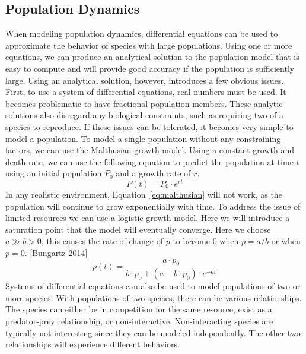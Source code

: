 \subsection{Population Dynamics}\label{subsec:population-dynamics}
    When modeling population dynamics, differential equations can be used to
    approximate the behavior of species with large populations.
    Using one or more equations, we can produce an analytical solution to the
    population model that is easy to compute and will provide good accuracy
    if the population is sufficiently large.
    Using an analytical solution, however, introduces a few obvious issues.
    First, to use a system of differential equations, real numbers must be used.
    It becomes problematic to have fractional population members.
    These analytic solutions also disregard any biological constraints,
    such as requiring two of a species to reproduce.
    If these issues can be tolerated, it becomes very simple to model a population.
    To model a single population without any constraining factors,
    we can use the Malthusian growth model.
    Using a constant growth and death rate, we can use the following equation
    to predict the population at time $t$ using an initial population $P_{0}$
    and a growth rate of $r$.
    \begin{equation}\label{eq:malthusian}
        P(t) = P_{0} \cdot e^{rt}
    \end{equation}
    In any realistic environment, Equation~\ref{eq:malthusian} will not work, as the population
    will continue to grow exponentially with time.
    To address the issue of limited resources we can use a logistic growth model.
    Here we will introduce a saturation point that the model will eventually converge.
    Here we choose $a \gg b > 0$, this causes the rate of change of $p$ to become $0$
    when $p = a/b$ or when $p = 0$. [Bungartz 2014]
    \begin{equation}\label{eq:logistic}
        \displaystyle p(t) =
        \frac{a \cdot p_0}{b \cdot p_0 + (a - b \cdot p_0) \cdot e^{-at}}
    \end{equation}
    Systems of differential equations can also be used to model populations of two
    or more species.
    With populations of two species, there can be various relationships.
    The species can either be in competition for the same resource,
    exist as a predator-prey relationship, or non-interactive.
    Non-interacting species are typically not interesting since they can be
    modeled independently.
    The other two relationships will experience different behaviors.
